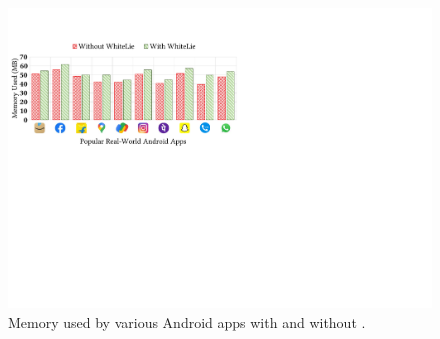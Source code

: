
\begin{figure}[t]
    \includegraphics[width=\linewidth]{Figures/Performance Evaluation/results_memory_used_target_app_real_world_apps.pdf}
    \caption{Memory used by various Android apps with and without \framework{}.}
    \label{fig:results_memUsedAll}
\end{figure}




